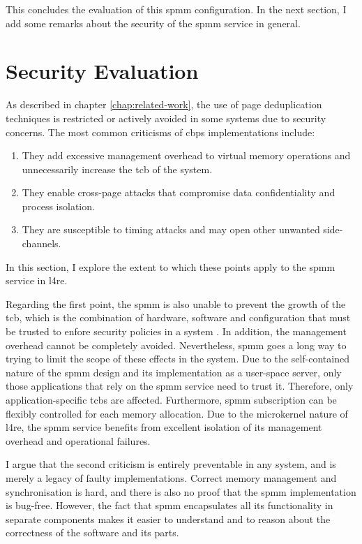 This concludes the evaluation of this \ac{spmm} configuration.
In the next section, I add some remarks about the security of the \ac{spmm} service in general.

\section{Security Evaluation}
\label{sec:security-evaluation}

As described in chapter \ref{chap:related-work}, the use of page deduplication techniques is restricted or actively avoided in some systems due to security concerns.
The most common criticisms of \ac{cbps} implementations include:

\begin{enumerate}
  \item They add excessive management overhead to virtual memory operations and unnecessarily increase the \ac{tcb} of the system.
  \item They enable cross-page attacks that compromise data confidentiality and process isolation.
  \item They are susceptible to timing attacks and may open other unwanted side-channels.
\end{enumerate}

In this section, I explore the extent to which these points apply to the \ac{spmm} service in \ac{l4re}.

Regarding the first point, the \ac{spmm} is also unable to prevent the growth of the \ac{tcb}, which is the combination of hardware, software and configuration that must be trusted to enfore security policies in a system \cite{tcsec1986}.
In addition, the management overhead cannot be completely avoided.
Nevertheless, \ac{spmm} goes a long way to trying to limit the scope of these effects in the system.
Due to the self-contained nature of the \ac{spmm} design and its implementation as a user-space server, only those applications that rely on the \ac{spmm} service need to trust it.
Therefore, only application-specific \acp{tcb} are affected.
Furthermore, \ac{spmm} subscription can be flexibly controlled for each memory allocation.
Due to the microkernel nature of \ac{l4re}, the \ac{spmm} service benefits from excellent isolation of its management overhead and operational failures.

I argue that the second criticism is entirely preventable in any system, and is merely a legacy of faulty implementations.
Correct memory management and synchronisation is hard, and there is also no proof that the \ac{spmm} implementation is bug-free.
However, the fact that \ac{spmm} encapsulates all its functionality in separate components makes it easier to understand and to reason about the correctness of the software and its parts.

